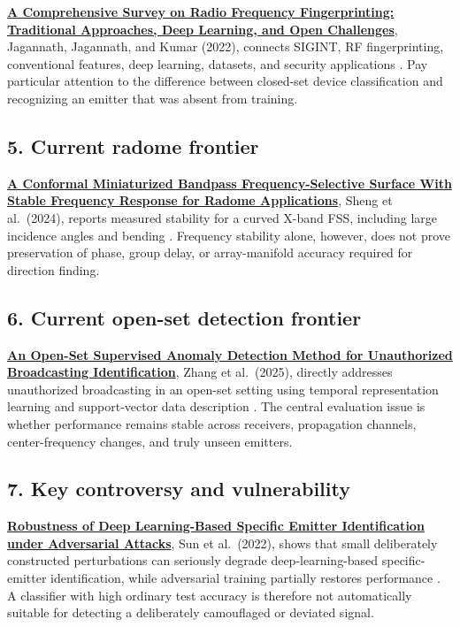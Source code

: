 \documentclass[
  10pt,
]{article}
\begin{document}
\href{https://consensus.app/papers/details/85a1acc05180584992b4bd752a62599e/?utm_source=chatgpt}{\textbf{A
Comprehensive Survey on Radio Frequency Fingerprinting: Traditional
Approaches, Deep Learning, and Open Challenges}}, Jagannath, Jagannath,
and Kumar (2022), connects SIGINT, RF fingerprinting, conventional
features, deep learning, datasets, and security applications
\citep{jagannath2022}. Pay particular attention to the difference
between closed-set device classification and recognizing an emitter that
was absent from training.

\subsection{5. Current radome frontier}\label{current-radome-frontier}

\href{https://consensus.app/papers/details/6cb5b6043f755325b7abd988656c9afd/?utm_source=chatgpt}{\textbf{A
Conformal Miniaturized Bandpass Frequency-Selective Surface With Stable
Frequency Response for Radome Applications}}, Sheng et al.~(2024),
reports measured stability for a curved X-band FSS, including large
incidence angles and bending \citep{sheng2024}. Frequency stability
alone, however, does not prove preservation of phase, group delay, or
array-manifold accuracy required for direction finding.

\subsection{6. Current open-set detection
frontier}\label{current-open-set-detection-frontier}

\href{https://consensus.app/papers/details/66ce93d9ddd05433ac370321a0d58745/?utm_source=chatgpt}{\textbf{An
Open-Set Supervised Anomaly Detection Method for Unauthorized
Broadcasting Identification}}, Zhang et al.~(2025), directly addresses
unauthorized broadcasting in an open-set setting using temporal
representation learning and support-vector data description
\citep{zhang2025open}. The central evaluation issue is whether
performance remains stable across receivers, propagation channels,
center-frequency changes, and truly unseen emitters.

\subsection{7. Key controversy and
vulnerability}\label{key-controversy-and-vulnerability}

\href{https://consensus.app/papers/details/29ea0ff4b51857cca284e60d8c9c9d19/?utm_source=chatgpt}{\textbf{Robustness
of Deep Learning-Based Specific Emitter Identification under Adversarial
Attacks}}, Sun et al.~(2022), shows that small deliberately constructed
perturbations can seriously degrade deep-learning-based specific-emitter
identification, while adversarial training partially restores
performance \citep{sun2022}. A classifier with high ordinary test
accuracy is therefore not automatically suitable for detecting a
deliberately camouflaged or deviated signal.
\end{document}
